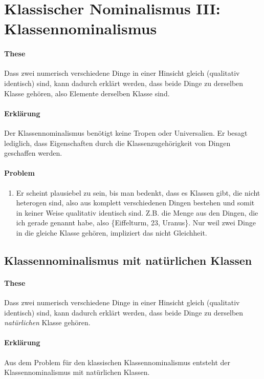 \documentclass[../main.tex]{subfiles}
\begin{document}
\section{Klassischer Nominalismus III: Klassennominalismus}
\paragraph{These} Dass zwei numerisch verschiedene Dinge in einer Hinsicht gleich (qualitativ identisch) sind, kann dadurch erklärt werden, dass beide Dinge zu derselben Klasse gehören, also Elemente derselben Klasse sind.
\paragraph{Erklärung} Der Klassennominalismus benötigt keine Tropen oder Universalien. Er besagt lediglich, dass Eigenschaften durch die Klassenzugehörigkeit von Dingen geschaffen werden. 
\paragraph{Problem}
\begin{enumerate}
	\item Er scheint plausiebel zu sein, bis man bedenkt, dass es Klassen gibt, die nicht heterogen sind, also aus komplett verschiedenen Dingen bestehen und somit in keiner Weise qualitativ identisch sind. Z.B. die Menge aus den Dingen, die ich gerade genannt habe, also \{Eiffelturm, 23, Uranus\}. Nur weil zwei Dinge in die gleiche Klasse gehören, impliziert das nicht Gleichheit. 
\end{enumerate}

\subsection{Klassennominalismus mit natürlichen Klassen}
\paragraph{These} Dass zwei numerisch verschiedene Dinge in einer Hinsicht gleich (qualitativ identisch) sind, kann dadurch erklärt werden, dass beide Dinge zu derselben \textit{natürlichen} Klasse gehören. 
\paragraph{Erklärung} Aus dem Problem für den klassischen Klassennominalismus entsteht der Klassennominalismus mit natürlichen Klassen. 
\end{document}
